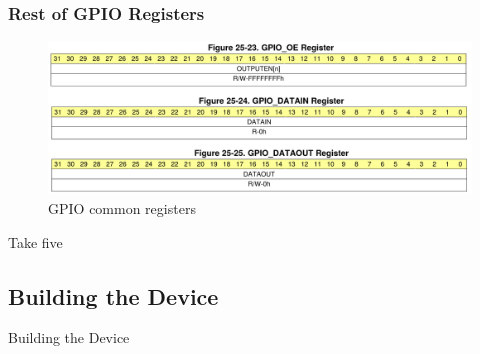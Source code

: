 \begin{frame}
  \frametitle{Rest of GPIO Registers}
    \begin{figure}
      \centering
      \includegraphics[scale=0.3]{images/gpio-common-regs.png}
      \caption{GPIO common registers}
  \end{figure}
\end{frame}

\begin{frame}[standout]
  Take five
\end{frame}

\subsection{Building the Device}

\begin{frame}[standout]
  Building the Device
\end{frame}

